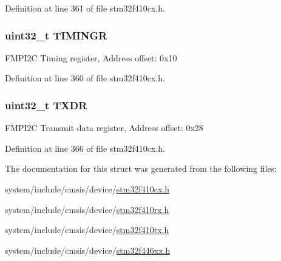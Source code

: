 Definition at line 361 of file stm32f410cx.\+h.

\subsubsection[{\texorpdfstring{T\+I\+M\+I\+N\+GR}{TIMINGR}}]{ uint32\+\_\+t T\+I\+M\+I\+N\+GR}\hypertarget{struct_f_m_p_i2_c___type_def_a5576a30ffbe0a0800ce7788610327677}{}\label{struct_f_m_p_i2_c___type_def_a5576a30ffbe0a0800ce7788610327677}
F\+M\+P\+I2C Timing register, Address offset\+: 0x10 

Definition at line 360 of file stm32f410cx.\+h.

\subsubsection[{\texorpdfstring{T\+X\+DR}{TXDR}}]{ uint32\+\_\+t T\+X\+DR}\hypertarget{struct_f_m_p_i2_c___type_def_ad7e8d785fff2acfeb8814e43bda8dd72}{}\label{struct_f_m_p_i2_c___type_def_ad7e8d785fff2acfeb8814e43bda8dd72}
F\+M\+P\+I2C Transmit data register, Address offset\+: 0x28 

Definition at line 366 of file stm32f410cx.\+h.



The documentation for this struct was generated from the following files\+:\begin{DoxyCompactItemize}
\item 
system/include/cmsis/device/\hyperlink{stm32f410cx_8h}{stm32f410cx.\+h}\item 
system/include/cmsis/device/\hyperlink{stm32f410rx_8h}{stm32f410rx.\+h}\item 
system/include/cmsis/device/\hyperlink{stm32f410tx_8h}{stm32f410tx.\+h}\item 
system/include/cmsis/device/\hyperlink{stm32f446xx_8h}{stm32f446xx.\+h}\end{DoxyCompactItemize}
